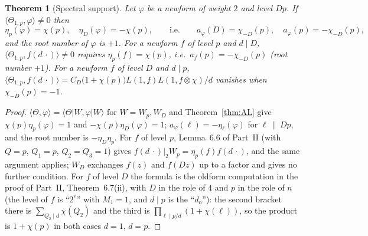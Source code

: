 \documentclass[11pt]{amsart}
\newtheorem{theorem}{Theorem}[section]
\theoremstyle{remark}
\begin{document}
\begin{theorem}[Spectral support]\label{thm:support}
Let $\varphi$ be a newform of weight $2$ and level $Dp$. If $\langle\Theta_{1,p},\varphi\rangle\ne0$ then
\[
\eta_p(\varphi)=\chi(p),\quad\eta_D(\varphi)=-\chi(p),\qquad\text{i.e.}\qquad a_\varphi(D)=\chi_{-D}(p),\quad a_\varphi(p)=-\chi_{-D}(p),
\]
and the root number of $\varphi$ is $+1$. For a newform $f$ of level $p$ and $d\mid D$, $\langle\Theta_{1,p},f(d\,\cdot)\rangle\ne0$ requires $\eta_p(f)=\chi(p)$, i.e.\ $a_f(p)=-\chi_{-D}(p)$ (root number $+1$). For a newform $f$ of level $D$ and $d\mid p$, $\langle\Theta_{1,p},f(d\,\cdot)\rangle=C_D\bigl(1+\chi(p)\bigr)L(1,f)L(1,f\otimes\chi)/d$ vanishes when $\chi_{-D}(p)=-1$.
\end{theorem}
\begin{proof}
$\langle\Theta,\varphi\rangle=\langle\Theta|W,\varphi|W\rangle$ for $W=W_p,W_D$ and Theorem~\ref{thm:AL} give $\chi(p)\eta_p(\varphi)=1$ and $-\chi(p)\eta_D(\varphi)=1$; $a_\varphi(\ell)=-\eta_\ell(\varphi)$ for $\ell\,\|\,Dp$, and the root number is $-\eta_D\eta_p$. For $f$ of level $p$, Lemma~6.6 of Part~II (with $Q=p$, $Q_1=p$, $Q_2=Q_3=1$) gives $f(d\,\cdot)|_2W_p=\eta_p(f)f(d\,\cdot)$, and the same argument applies; $W_D$ exchanges $f(z)$ and $f(Dz)$ up to a factor and gives no further condition. For $f$ of level $D$ the formula is the oldform computation in the proof of Part~II, Theorem~6.7(ii), with $D$ in the role of $4$ and $p$ in the role of $n$ (the level of $f$ is ``$2^e$'' with $M_1=1$, and $d\mid p$ is the ``$d_{\mathrm o}$''): the second bracket there is $\sum_{Q_2\mid d}\chi(Q_2)$ and the third is $\prod_{\ell\mid p/d}(1+\chi(\ell))$, so the product is $1+\chi(p)$ in both cases $d=1$, $d=p$.
\end{proof}
\end{document}
